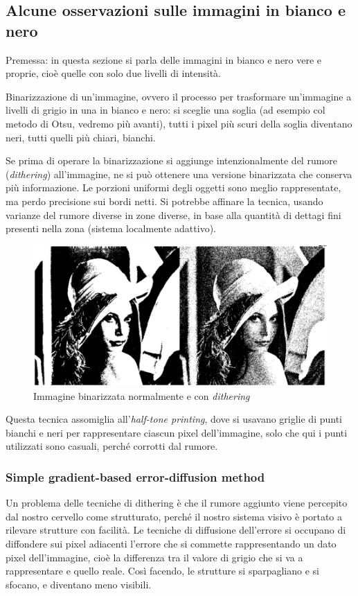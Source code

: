 \documentclass[a4paper,11pt]{article}
\begin{document}
\subsection{Alcune osservazioni sulle immagini in bianco e nero}
Premessa: in questa sezione si parla delle immagini in bianco e nero vere e proprie, cioè quelle con solo due livelli di intensità.
\par
Binarizzazione di un'immagine, ovvero il processo per trasformare un'immagine a livelli di grigio in una in bianco e nero: si sceglie una soglia
(ad esempio col metodo di Otsu, vedremo più avanti), tutti i pixel più scuri della soglia diventano neri, tutti quelli più chiari, bianchi.
\par
Se prima di operare la binarizzazione si aggiunge intenzionalmente del rumore (\textit{dithering}) all'immagine, ne si può
ottenere una versione binarizzata che conserva più informazione. Le porzioni uniformi degli oggetti sono meglio rappresentate, ma perdo precisione
sui bordi netti. Si potrebbe affinare la tecnica, usando varianze del rumore diverse in zone diverse, in base alla quantità di dettagi fini presenti nella zona
(sistema localmente adattivo).

\renewcommand{\thefigure}{5.7}
\begin{figure}[!h]
  \centering
    \includegraphics[scale=0.4]{images/5/binarization.png}
    \caption{Immagine binarizzata normalmente e con \textit{dithering}}
\end{figure}

Questa tecnica assomiglia all'\textit{half-tone printing}, dove si usavano griglie di punti
bianchi e neri per rappresentare ciascun pixel dell'immagine, solo che qui i punti utilizzati sono casuali, perché corrotti dal rumore.

\subsubsection{Simple gradient-based error-diffusion method}
Un problema delle tecniche di dithering è che il rumore aggiunto viene percepito dal nostro cervello come strutturato, perché il nostro sistema visivo
è portato a rilevare strutture con facilità.
Le tecniche di diffusione dell'errore si occupano di diffondere sui pixel adiacenti l'errore che si commette rappresentando un dato pixel dell'immagine,
cioè la differenza tra il valore di grigio che si va a rappresentare e quello reale. Così facendo, le strutture si sparpagliano e si sfocano, e diventano meno visibili.
\end{document}
